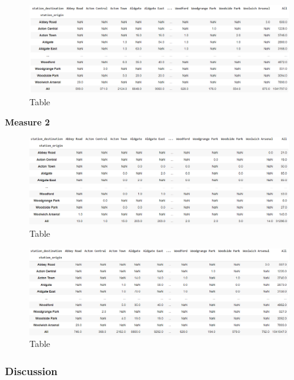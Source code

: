\documentclass[10pt]{report}
\numberwithin{figure}{section}
\numberwithin{table}{section}
\begin{document}
    \begin{figure}[htp]
        \centering
        \includegraphics[width=14cm]{Image/Part2_OD6_scenario B.png}
        \caption{Table}
        \label{fig:galaxy}
    \end{figure}

\textbf{Measure 2}    
    \begin{figure}[htp]
        \centering
        \includegraphics[width=14cm]{Image/Part2_OD7_scenario B.png}
        \caption{Table}
        \label{fig:galaxy}
    \end{figure}

    \begin{figure}[htp]
        \centering
        \includegraphics[width=14cm]{Image/Part2_OD8_scenario B.png}
        \caption{Table}
        \label{fig:galaxy}
    \end{figure}

\newpage    

\subsubsection{Discussion}













\newpage
\printbibliography[title = {References}]
\end{document}
